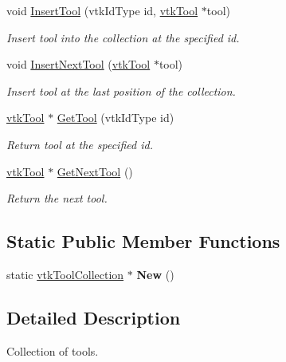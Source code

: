\begin{DoxyCompactItemize}
\item 
void \hyperlink{classvtkToolCollection_a7bf8d8954ceaafb5c5985eac7d96eb18}{InsertTool} (vtkIdType id, \hyperlink{classvtkTool}{vtkTool} $\ast$tool)
\begin{DoxyCompactList}\small\item\em Insert tool into the collection at the specified id. \item\end{DoxyCompactList}\item 
void \hyperlink{classvtkToolCollection_a77f6ddcba9da4caf9bd9204f20c1c6f2}{InsertNextTool} (\hyperlink{classvtkTool}{vtkTool} $\ast$tool)
\begin{DoxyCompactList}\small\item\em Insert tool at the last position of the collection. \item\end{DoxyCompactList}\item 
\hyperlink{classvtkTool}{vtkTool} $\ast$ \hyperlink{classvtkToolCollection_aaf3ad76ac0105f5f83775f189a56046b}{GetTool} (vtkIdType id)
\begin{DoxyCompactList}\small\item\em Return tool at the specified id. \item\end{DoxyCompactList}\item 
\hyperlink{classvtkTool}{vtkTool} $\ast$ \hyperlink{classvtkToolCollection_ad58c5c348bd19de77143836948761d61}{GetNextTool} ()
\begin{DoxyCompactList}\small\item\em Return the next tool. \item\end{DoxyCompactList}\end{DoxyCompactItemize}
\subsection*{Static Public Member Functions}
\begin{DoxyCompactItemize}
\item 
\hypertarget{classvtkToolCollection_ac61f3f35811b04742d5cfa36e513cdac}{
static \hyperlink{classvtkToolCollection}{vtkToolCollection} $\ast$ {\bfseries New} ()}
\label{classvtkToolCollection_ac61f3f35811b04742d5cfa36e513cdac}

\end{DoxyCompactItemize}


\subsection{Detailed Description}
Collection of tools. 

